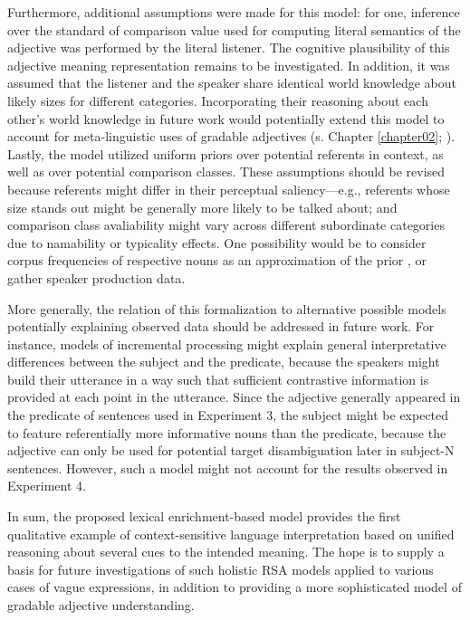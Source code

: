 Furthermore, additional assumptions were made for this model: for one, inference over the standard of comparison value used for computing literal semantics of the adjective was performed by the literal listener. The cognitive plausibility of this adjective meaning representation remains to be investigated. In addition, it was assumed that the listener and the speaker share identical world knowledge about likely sizes for different categories. Incorporating their reasoning about each other's world knowledge in future work would potentially extend this model to account for meta-linguistic uses of gradable adjectives (s. Chapter \ref{chapter02}; \textcite{barker2002dynamics}). Lastly, the model utilized uniform priors over potential referents in context, as well as over potential comparison classes. These assumptions should be revised because referents might differ in their perceptual saliency---e.g., referents whose size stands out might be generally more likely to be talked about; and comparison class avaliability might vary across different subordinate categories due to namability or typicality effects. One possibility would be to consider corpus frequencies of respective nouns as an approximation of the prior \parencite[following the model by][]{tessler2017warm}, or gather speaker production data. 

More generally, the relation of this formalization to alternative possible models potentially explaining observed data should be addressed in future work. For instance, models of incremental processing might explain general interpretative differences between the subject and the predicate, because the speakers might build their utterance in a way such that sufficient contrastive information is provided at each point in the utterance. Since the adjective generally appeared in the predicate of sentences used in Experiment 3, the subject might be expected to feature referentially more informative nouns than the predicate, because the adjective can only be used for potential target disambiguation later  in subject-N sentences. However, such a model might not account for the results observed in Experiment 4.  

In sum, the proposed lexical enrichment-based model provides the first qualitative example of context-sensitive language interpretation based on unified reasoning about several cues to the intended meaning. The hope is to supply a basis for future investigations of such holistic RSA models applied to various cases of vague expressions, in addition to providing a more sophisticated model of gradable adjective understanding.
